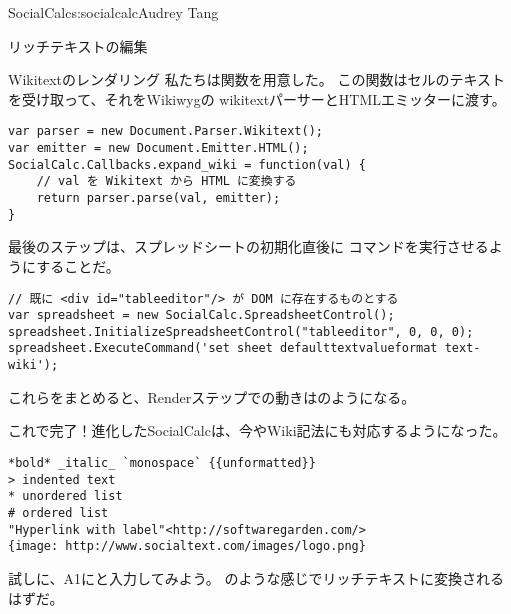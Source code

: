 \begin{aosachapter}{SocialCalc}{s:socialcalc}{Audrey Tang}
\begin{aosasect1}{リッチテキストの編集}
\begin{aosasect2}{Wikitextのレンダリング}
私たちは関数を用意した。
この関数はセルのテキストを受け取って、それをWikiwygの
wikitextパーサーとHTMLエミッターに渡す。

\begin{verbatim}
var parser = new Document.Parser.Wikitext();
var emitter = new Document.Emitter.HTML();
SocialCalc.Callbacks.expand_wiki = function(val) {
    // val を Wikitext から HTML に変換する
    return parser.parse(val, emitter);
}
\end{verbatim}

\pagebreak 
\noindent
最後のステップは、スプレッドシートの初期化直後に
コマンドを実行させるようにすることだ。


\begin{verbatim}
// 既に <div id="tableeditor"/> が DOM に存在するものとする
var spreadsheet = new SocialCalc.SpreadsheetControl();
spreadsheet.InitializeSpreadsheetControl("tableeditor", 0, 0, 0);
spreadsheet.ExecuteCommand('set sheet defaulttextvalueformat text-wiki');
\end{verbatim}

\noindent
これらをまとめると、Renderステップでの動きはのようになる。


これで完了！進化したSocialCalcは、今やWiki記法にも対応するようになった。

\begin{verbatim}
*bold* _italic_ `monospace` {{unformatted}}
> indented text
* unordered list
# ordered list
"Hyperlink with label"<http://softwaregarden.com/>
{image: http://www.socialtext.com/images/logo.png}
\end{verbatim}

\noindent
試しに、A1にと入力してみよう。
のような感じでリッチテキストに変換されるはずだ。


\end{aosasect2}
\end{aosasect1}
\end{aosachapter}
